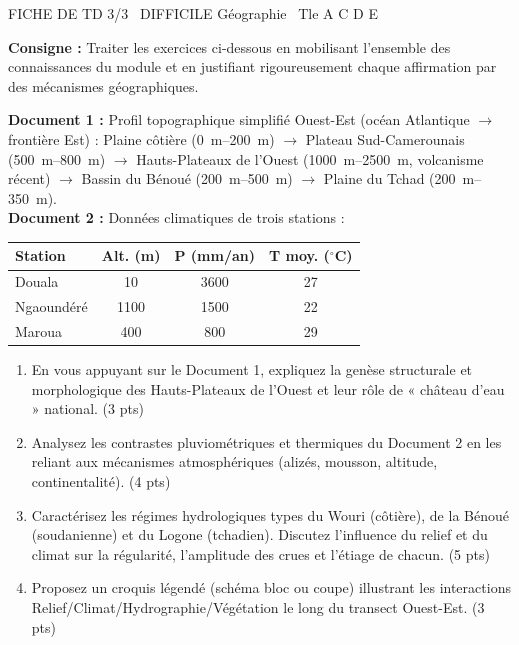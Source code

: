 \documentclass[11pt]{article}
\begin{document}
\begin{tcolorbox}[enhanced,colback=popink,colframe=popink,arc=10pt,boxrule=0pt,left=12pt,right=12pt,top=9pt,bottom=9pt]
{\color{white}\popxbold\small FICHE DE TD 3/3 \textbullet\ DIFFICILE \hfill Géographie \textbullet\ Tle A C D E\par}
\end{tcolorbox}
\vspace{4pt}
\noindent \textbf{Consigne :} Traiter les exercices ci-dessous en mobilisant l'ensemble des connaissances du module et en justifiant rigoureusement chaque affirmation par des mécanismes géographiques.

\begin{exercice}
    \textbf{Document 1 :} Profil topographique simplifié Ouest-Est (océan Atlantique $\rightarrow$ frontière Est) : Plaine côtière (\SI{0}{m}--\SI{200}{m}) $\rightarrow$ Plateau Sud-Camerounais (\SI{500}{m}--\SI{800}{m}) $\rightarrow$ Hauts-Plateaux de l'Ouest (\SI{1000}{m}--\SI{2500}{m}, volcanisme récent) $\rightarrow$ Bassin du Bénoué (\SI{200}{m}--\SI{500}{m}) $\rightarrow$ Plaine du Tchad (\SI{200}{m}--\SI{350}{m}).\\
    \textbf{Document 2 :} Données climatiques de trois stations :
    \begin{center}
    \begin{tabular}{lccc}
    \toprule
    Station & Alt. (m) & P (mm/an) & T moy. ($^\circ$C) \\
    \midrule
    Douala & 10 & 3600 & 27 \\
    Ngaoundéré & 1100 & 1500 & 22 \\
    Maroua & 400 & 800 & 29 \\
    \bottomrule
    \end{tabular}
    \end{center}
    \begin{enumerate}
        \item En vous appuyant sur le Document 1, expliquez la genèse structurale et morphologique des Hauts-Plateaux de l'Ouest et leur rôle de « château d'eau » national. (3 pts)
        \item Analysez les contrastes pluviométriques et thermiques du Document 2 en les reliant aux mécanismes atmosphériques (alizés, mousson, altitude, continentalité). (4 pts)
        \item Caractérisez les régimes hydrologiques types du Wouri (côtière), de la Bénoué (soudanienne) et du Logone (tchadien). Discutez l'influence du relief et du climat sur la régularité, l'amplitude des crues et l'étiage de chacun. (5 pts)
        \item Proposez un croquis légendé (schéma bloc ou coupe) illustrant les interactions Relief/Climat/Hydrographie/Végétation le long du transect Ouest-Est. (3 pts)
    \end{enumerate}
\end{exercice}
\end{document}
